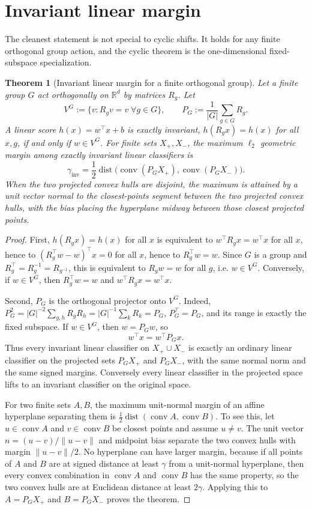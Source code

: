 \documentclass[11pt]{article}
\theoremstyle{plain}
\newtheorem{theorem}{Theorem}
\theoremstyle{definition}
\theoremstyle{remark}
\newcommand{\R}{\mathbb{R}}
\newcommand{\conv}{\operatorname{conv}}
\newcommand{\dist}{\operatorname{dist}}
\begin{document}
\section{Invariant linear margin}
The cleanest statement is not special to cyclic shifts.  It holds for any finite orthogonal group action, and the cyclic theorem is the one-dimensional fixed-subspace specialization.

\begin{theorem}[Invariant linear margin for a finite orthogonal group]\label{thm:finite-group-margin}
Let a finite group $G$ act orthogonally on $\R^d$ by matrices $R_g$.  Let
\[
V^G:=\{v:R_gv=v\;\forall g\in G\},\qquad P_G:=\frac1{|G|}\sum_{g\in G}R_g.
\]
A linear score $h(x)=w^\top x+b$ is exactly invariant, $h(R_gx)=h(x)$ for all $x,g$, if and only if $w\in V^G$.  For finite sets $X_+,X_-$, the maximum $\ell_2$ geometric margin among exactly invariant linear classifiers is
\[
\gamma_{\mathrm{inv}}
=\frac12\dist\big(\conv(P_GX_+),\conv(P_GX_-)\big).
\]
When the two projected convex hulls are disjoint, the maximum is attained by a unit vector normal to the closest-points segment between the two projected convex hulls, with the bias placing the hyperplane midway between those closest projected points.
\end{theorem}

\begin{proof}
First, $h(R_gx)=h(x)$ for all $x$ is equivalent to $w^\top R_gx=w^\top x$ for all $x$, hence to $(R_g^\top w-w)^\top x=0$ for all $x$, hence to $R_g^\top w=w$.  Since $G$ is a group and $R_g^\top=R_g^{-1}=R_{g^{-1}}$, this is equivalent to $R_gw=w$ for all $g$, i.e. $w\in V^G$.  Conversely, if $w\in V^G$, then $R_g^\top w=w$ and $w^\top R_gx=w^\top x$.

Second, $P_G$ is the orthogonal projector onto $V^G$.  Indeed, $P_G^2=|G|^{-2}\sum_{g,h}R_gR_h=|G|^{-1}\sum_k R_k=P_G$, $P_G^\top=P_G$, and its range is exactly the fixed subspace.  If $w\in V^G$, then $w=P_Gw$, so
\[
w^\top x=w^\top P_Gx.
\]
Thus every invariant linear classifier on $X_+\cup X_-$ is exactly an ordinary linear classifier on the projected sets $P_GX_+$ and $P_GX_-$, with the same normal norm and the same signed margins.  Conversely every linear classifier in the projected space lifts to an invariant classifier on the original space.

For two finite sets $A,B$, the maximum unit-normal margin of an affine hyperplane separating them is $\frac12\dist(\conv A,\conv B)$.  To see this, let $u\in\conv A$ and $v\in\conv B$ be closest points and assume $u\ne v$.  The unit vector $n=(u-v)/\|u-v\|$ and midpoint bias separate the two convex hulls with margin $\|u-v\|/2$.  No hyperplane can have larger margin, because if all points of $A$ and $B$ are at signed distance at least $\gamma$ from a unit-normal hyperplane, then every convex combination in $\conv A$ and $\conv B$ has the same property, so the two convex hulls are at Euclidean distance at least $2\gamma$.  Applying this to $A=P_GX_+$ and $B=P_GX_-$ proves the theorem.
\end{proof}
\end{document}
